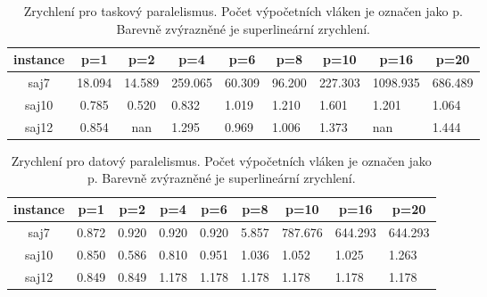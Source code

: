 \documentclass{article}
\begin{document}
    \begin{table}[h]
        \centering
        \begin{tabular}{|c|c|c|l|l|l|l|l|l|}
            \hline
            \textbf{instance} &
            \textbf{p=1} &
            \textbf{p=2} &
            \multicolumn{1}{c|}{\textbf{p=4}} &
            \multicolumn{1}{c|}{\textbf{p=6}} &
            \multicolumn{1}{c|}{\textbf{p=8}} &
            \multicolumn{1}{c|}{\textbf{p=10}} &
            \multicolumn{1}{c|}{\textbf{p=16}} &
            \multicolumn{1}{c|}{\textbf{p=20}} \\ \hline
            saj7 &
                {\color[HTML]{FE0000} 18.094} &
                {\color[HTML]{FE0000} 14.589} &
                {\color[HTML]{FE0000} 259.065} &
                {\color[HTML]{FE0000} 60.309} &
                {\color[HTML]{FE0000} 96.200} &
                {\color[HTML]{FE0000} 227.303} &
                {\color[HTML]{FE0000} 1098.935} &
                {\color[HTML]{FE0000} 686.489} \\ \hline
            saj10 & 0.785 & 0.520 & 0.832 & 1.019 & 1.210 & 1.601 & 1.201 & 1.064 \\ \hline
            saj12 & 0.854 & nan   & 1.295 & 0.969 & 1.006 & 1.373 & nan   & 1.444 \\ \hline
        \end{tabular}
        \caption{Zrychlení pro taskový paralelismus. Počet výpočetních vláken je označen jako p. Barevně zvýrazněné
                    je superlineární zrychlení.}
        \label{tab:speedup-openmp-task}
    \end{table}

    \begin{table}[h]
        \centering
        \begin{tabular}{|c|c|c|l|l|l|l|l|l|}
            \hline
            \textbf{instance} &
            \textbf{p=1} &
            \textbf{p=2} &
            \multicolumn{1}{c|}{\textbf{p=4}} &
            \multicolumn{1}{c|}{\textbf{p=6}} &
            \multicolumn{1}{c|}{\textbf{p=8}} &
            \multicolumn{1}{c|}{\textbf{p=10}} &
            \multicolumn{1}{c|}{\textbf{p=16}} &
            \multicolumn{1}{c|}{\textbf{p=20}} \\ \hline
            saj7  & 0.872 & 0.920 & 0.920 & 0.920 & 5.857 & {\color[HTML]{FE0000} 787.676} & {\color[HTML]{FE0000} 644.293} & {\color[HTML]{FE0000} 644.293} \\ \hline
            saj10 & 0.850 & 0.586 & 0.810 & 0.951 & 1.036 & 1.052                          & 1.025                          & 1.263                          \\ \hline
            saj12 & 0.849 & 0.849 & 1.178 & 1.178 & 1.178 & 1.178                          & 1.178                          & 1.178                          \\ \hline
        \end{tabular}
        \caption{ Zrychlení pro datový paralelismus. Počet výpočetních vláken je označen jako p. Barevně zvýrazněné je superlineární zrychlení.}
        \label{tab:speedup-openmp-data}
    \end{table}
\end{document}
